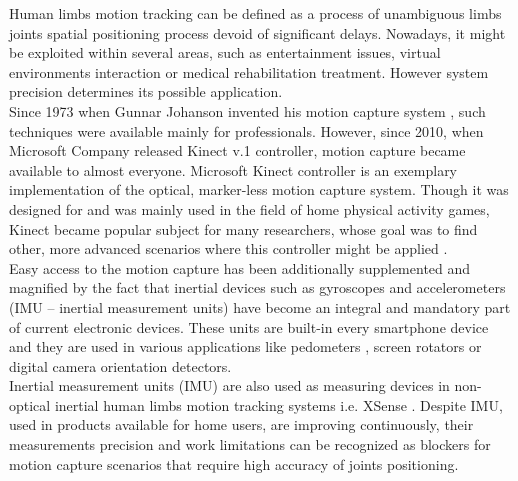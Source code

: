 \documentclass[sensors,article,submit,moreauthors,pdftex,10pt,a4paper]{mdpi}
\begin{document}
Human limbs motion tracking can be defined as a process of unambiguous limbs joints spatial positioning process devoid of significant delays. Nowadays, it might be exploited within several areas, such as entertainment issues, virtual environments interaction or medical rehabilitation treatment. However system precision determines its possible application. \\
Since 1973 when Gunnar Johanson invented his motion capture system \cite{Johansson1973}, such techniques were available mainly for professionals. However, since 2010, when Microsoft Company released Kinect v.1 controller, motion capture became available to almost everyone. Microsoft Kinect controller is an exemplary implementation of the optical, marker-less motion capture system. Though it was designed for and was mainly used in the field of home physical activity games, Kinect became popular subject for many researchers, whose goal was to find other, more advanced scenarios where this controller might be applied \cite{Lange2012, Chang2011}.\\
Easy access to the motion capture has been additionally supplemented and magnified by the fact that inertial devices such as gyroscopes and accelerometers (IMU – inertial measurement units) have become an integral and mandatory part of current electronic devices. These units are built-in every smartphone device and they are used in various applications like pedometers \cite{Huang2012,Jayalath2013}, screen rotators \cite{Pedley2013} or digital camera orientation detectors.\\
Inertial measurement units (IMU) are also used as measuring devices in non-optical inertial human limbs motion tracking systems i.e. XSense \cite{XsensCorp}. Despite IMU, used in products available for home users, are improving continuously, their measurements precision and work limitations can be recognized as blockers for motion capture scenarios that require high accuracy of joints positioning.\\%
\end{document}
